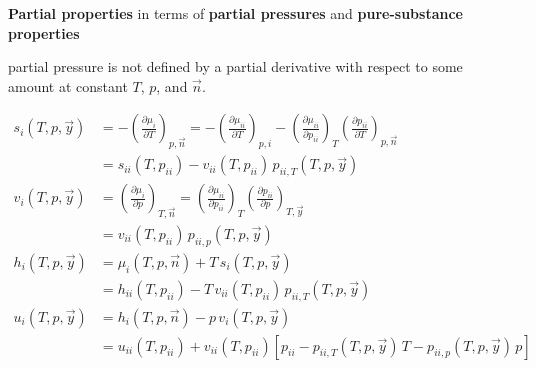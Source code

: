 \begin{defn}
    \textbf{Partial properties} in terms of \textbf{partial pressures} and \textbf{pure-substance properties}
    \begin{zhu}
        partial pressure is not defined by a partial derivative 
        with respect to some amount at constant \(T\), \(p\), and \(\vec{n}\).
    \end{zhu}
    \begin{align*}
        s_i(T, p, \vec{y}) &= - \left( \frac{\partial \mu_i}{\partial T} \right)_{p, \vec{n}} 
        = - \left( \frac{\partial \mu_{ii}}{\partial T} \right)_{p, i} - \left( \frac{\partial \mu_{ii}}{\partial p_{ii}} \right)_T \left( \frac{\partial p_{ii}}{\partial T} \right)_{p, \vec{n}} \\
        &= s_{ii}(T, p_{ii}) - v_{ii}(T, p_{ii}) \, p_{ii,T}(T, p, \vec{y}) 
    \\
        v_i(T, p, \vec{y}) &= \left( \frac{\partial \mu_i}{\partial p} \right)_{T, \vec{n}} 
        = \left( \frac{\partial \mu_{ii}}{\partial p_{ii}} \right)_T \left( \frac{\partial p_{ii}}{\partial p} \right)_{T, \vec{y}} \\
        &= v_{ii}(T, p_{ii}) \, p_{ii,p}(T, p, \vec{y})
    \\
        h_i(T, p, \vec{y}) &= \mu_i(T, p, \vec{n}) + T \, s_i(T, p, \vec{y}) \\
        &= h_{ii}(T, p_{ii}) - T \, v_{ii}(T, p_{ii}) \, p_{ii,T}(T, p, \vec{y})
    \\
        u_i(T, p, \vec{y}) &= h_i(T, p, \vec{n}) - p \, v_i(T, p, \vec{y}) \\
        &= u_{ii}(T, p_{ii}) + v_{ii}(T, p_{ii}) \left[ p_{ii} - p_{ii,T}(T, p, \vec{y}) \, T - p_{ii,p}(T, p, \vec{y}) \, p \right]
    \end{align*}
\end{defn}











\ifx\allfiles\undefined

\fi
